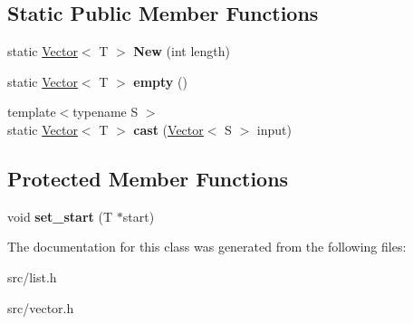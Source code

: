 \subsection*{Static Public Member Functions}
\begin{DoxyCompactItemize}
\item 
\hypertarget{classv8_1_1internal_1_1_vector_adb4189b3dc89e2c2dfd532c5615ead33}{}static \hyperlink{classv8_1_1internal_1_1_vector}{Vector}$<$ T $>$ {\bfseries New} (int length)\label{classv8_1_1internal_1_1_vector_adb4189b3dc89e2c2dfd532c5615ead33}

\item 
\hypertarget{classv8_1_1internal_1_1_vector_a5a178ac96e3a64e7f2addc3b201285fd}{}static \hyperlink{classv8_1_1internal_1_1_vector}{Vector}$<$ T $>$ {\bfseries empty} ()\label{classv8_1_1internal_1_1_vector_a5a178ac96e3a64e7f2addc3b201285fd}

\item 
\hypertarget{classv8_1_1internal_1_1_vector_a12baedd3e605f40b24f28f3d05716a23}{}{\footnotesize template$<$typename S $>$ }\\static \hyperlink{classv8_1_1internal_1_1_vector}{Vector}$<$ T $>$ {\bfseries cast} (\hyperlink{classv8_1_1internal_1_1_vector}{Vector}$<$ S $>$ input)\label{classv8_1_1internal_1_1_vector_a12baedd3e605f40b24f28f3d05716a23}

\end{DoxyCompactItemize}
\subsection*{Protected Member Functions}
\begin{DoxyCompactItemize}
\item 
\hypertarget{classv8_1_1internal_1_1_vector_a9da3046624f3492e444896bcd1b5225f}{}void {\bfseries set\+\_\+start} (T $\ast$start)\label{classv8_1_1internal_1_1_vector_a9da3046624f3492e444896bcd1b5225f}

\end{DoxyCompactItemize}


The documentation for this class was generated from the following files\+:\begin{DoxyCompactItemize}
\item 
src/list.\+h\item 
src/vector.\+h\end{DoxyCompactItemize}
